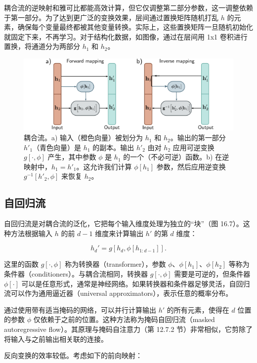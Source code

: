耦合流的逆映射和雅可比都能高效计算，但它仅调整第二部分参数，这一调整依赖于第一部分。为了达到更广泛的变换效果，层间通过置换矩阵随机打乱 \(h\) 的元素，确保每个变量最终都被其他变量转换。实际上，这些置换矩阵一旦随机初始化就固定下来，不再学习。对于结构化数据，如图像，通过在层间用 1x1 卷积进行置换，将通道分为两部分 \(h_1\) 和 \(h_2\)。

\begin{figure}[ht!]
\centering
\includegraphics[width=0.7\linewidth]{png/chapter16/FlowCoupling.png}
\caption{耦合流。a) 输入（橙色向量）被划分为 \( h_1 \) 和 \( h_2 \)。输出的第一部分 \( h'_1 \)（青色向量）是 \( h_1 \) 的副本。输出 \( h'_2 \) 由对 \( h_2 \) 应用可逆变换 \( g[\cdot, \phi] \) 产生，其中参数 \( \phi \) 是 \( h_1 \) 的一个（不必可逆）函数。b) 在逆映射中，\( h_1 = h'_1 \)。这允许我们计算 \( \phi[h_1] \) 参数，然后应用逆变换 \( g^{-1}[h'_2, \phi] \) 来恢复 \( h_2 \)。}
\end{figure}


\subsection{自回归流}
自回归流是对耦合流的泛化，它把每个输入维度处理为独立的“块”（图 16.7）。这种方法根据输入 \(h\) 的前 \(d-1\) 维度来计算输出 \(h'\) 的第 \(d\) 维度：

\begin{equation}
h_d' = g[h_d, \phi[h_{1:d-1}]]. 
\end{equation}

这里的函数 \(g[\cdot, \phi]\) 称为转换器（transformer），参数 \(\phi\)、\(\phi[h_1]\)、\(\phi[h_2]\) 等称为条件器（conditioners）。与耦合流相同，转换器 \(g[\cdot, \phi]\) 需要是可逆的，但条件器 \(\phi[\cdot]\) 可以是任意形式，通常是神经网络。如果转换器和条件器足够灵活，自回归流可以作为通用逼近器（universal approximators），表示任意的概率分布。

通过使用带有适当掩码的网络，可以并行计算输出 \(h'\) 的所有元素，使得在 \(d\) 位置的参数 \(\phi\) 仅依赖于之前的位置。这种方法称为掩码自回归流（masked autoregressive flow）。其原理与掩码自注意力（第 12.7.2 节）非常相似，它剪除了将输入与之前输出相关联的连接。

反向变换的效率较低。考虑如下的前向映射：


